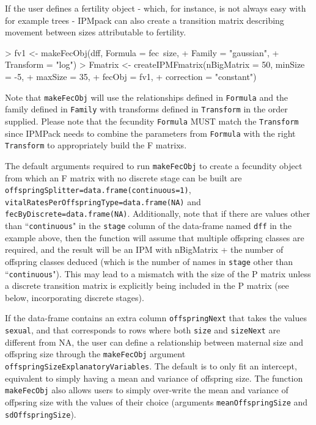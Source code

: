 \documentclass{article}
\begin{document}
If the user defines a fertility object - which, for instance, is not always easy with for example trees - IPMpack can also create a transition matrix describing movement between sizes attributable to fertility.
\begin{Schunk}
\begin{Sinput}
> fv1 <- makeFecObj(dff, Formula = fec~size, 	
+                   Family = "gaussian", 
+                   Transform = "log")
> Fmatrix <- createIPMFmatrix(nBigMatrix = 50, minSize = -5,
+                             maxSize = 35, 
+                             fecObj = fv1, 
+                             correction = "constant")
\end{Sinput}
\end{Schunk}
Note that {\tt makeFecObj} will use the relationships defined in {\tt Formula} and the family defined in {\tt Family} with transforms defined in {\tt Transform} in the order supplied. Please note that the fecundity {\tt Formula} MUST match the {\tt Transform} since IPMPack needs to combine the parameters from  {\tt Formula}  with the right  {\tt Transform}  to appropriately build the F matrixs. 

The default arguments required to run {\tt makeFecObj} to create a fecundity
object from which an F matrix with no discrete stage can be built are {\tt
offspringSplitter=data.frame(continuous=1)}, {\tt 
vitalRatesPerOffspringType=data.frame(NA)} and {\tt fecByDiscrete=data.frame(NA)}.
Additionally, note that if there are values other than ``{\tt continuous}" in the {\tt stage} column of the data-frame named {\tt dff} in the example above, then the function will assume that multiple offspring classes are required, and the result will be an IPM with nBigMatrix + the number of offspring classes deduced (which is the number of names in {\tt stage} other than ``{\tt continuous}"). This may lead to a mismatch with the size of the P matrix unless a discrete transition matrix is explicitly being included in the P matrix (see below, incorporating discrete stages).

If the data-frame contains an extra column {\tt offspringNext} that takes the
values {\tt sexual}, and that corresponds to rows where both {\tt size} and {\tt sizeNext} are different from NA, the user can define a relationship between maternal size and offspring size through the {\tt makeFecObj} argument {\tt offspringSizeExplanatoryVariables}. The default is to only fit an intercept, equivalent to simply having a mean and variance of offspring size. The function {\tt makeFecObj} also allows users to simply over-write the mean and variance of offpsring size with the values of their choice (arguments {\tt meanOffspringSize} and {\tt sdOffspringSize}).
\end{document}
